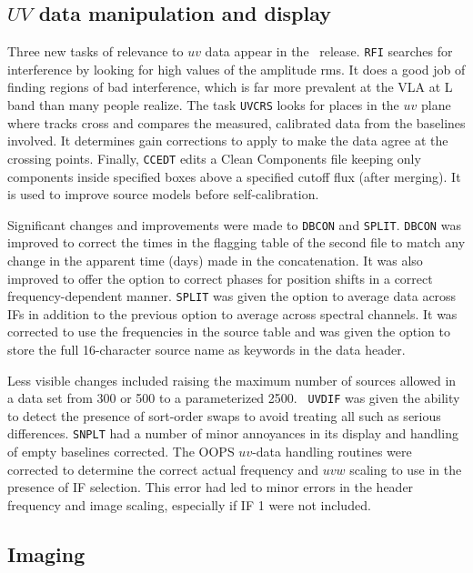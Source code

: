 \subsection{$UV$ data manipulation and display}

Three new tasks of relevance to $uv$ data appear in the \RELEASENAME\
release.  {\tt RFI} searches for interference by looking for high
values of the amplitude rms.  It does a good job of finding regions of
bad interference, which is far more prevalent at the VLA at L band
than many people realize.  The task {\tt UVCRS} looks for places in
the $uv$ plane where tracks cross and compares the measured,
calibrated data from the baselines involved.  It determines gain
corrections to apply to make the data agree at the crossing points.
Finally, {\tt CCEDT} edits a Clean Components file keeping only
components inside specified boxes above a specified cutoff flux (after
merging).  It is used to improve source models before
self-calibration.

Significant changes and improvements were made to {\tt DBCON} and
\hbox{{\tt SPLIT}}.  {\tt DBCON} was improved to correct the times in
the flagging table of the second file to match any change in the
apparent time (days) made in the concatenation.  It was also improved
to offer the option to correct phases for position shifts in a correct
frequency-dependent manner.  {\tt SPLIT} was given the option to
average data across IFs in addition to the previous option to average
across spectral channels.  It was corrected to use the frequencies in
the source table and was given the option to store the full
16-character source name as keywords in the data header.

Less visible changes included raising the maximum number of sources
allowed in a data set from 300 or 500 to a parameterized 2500.  {\tt
UVDIF} was given the ability to detect the presence of sort-order
swaps to avoid treating all such as serious differences.  {\tt SNPLT}
had a number of minor annoyances in its display and handling of empty
baselines corrected.  The OOPS $uv$-data handling routines were
corrected to determine the correct actual frequency and $uvw$ scaling
to use in the presence of IF selection.  This error had led to minor
errors in the header frequency and image scaling, especially if IF 1
were not included.

\clearpage

\subsection{Imaging}


